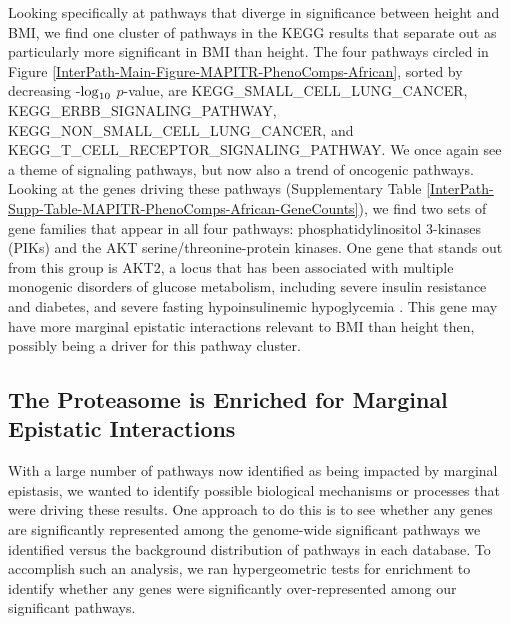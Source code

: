 \documentclass[12pt,a4paper]{article}
\def\log{{\rm log}}
\begin{document}
Looking specifically at pathways that diverge in significance between height and BMI, we find one cluster of pathways in the KEGG results that separate out as particularly more significant in BMI than height. The four pathways circled in Figure \ref{InterPath-Main-Figure-MAPITR-PhenoComps-African}, sorted by decreasing -$\log_{10}$ $p$-value, are KEGG\_SMALL\_CELL\_LUNG\_CANCER, KEGG\_ERBB\_SIGNALING\_PATHWAY, KEGG\_NON\_SMALL\_CELL\_LUNG\_CANCER, and KEGG\_T\_CELL\_RECEPTOR\_SIGNALING\_PATHWAY. We once again see a theme of signaling pathways, but now also a trend of oncogenic pathways. Looking at the genes driving these pathways (Supplementary Table \ref{InterPath-Supp-Table-MAPITR-PhenoComps-African-GeneCounts}), we find two sets of gene families that appear in all four pathways: phosphatidylinositol 3-kinases (PIKs) and the AKT serine/threonine-protein kinases. One gene that stands out from this group is AKT2, a locus that has been associated with multiple monogenic disorders of glucose metabolism, including severe insulin resistance and diabetes, and severe fasting hypoinsulinemic hypoglycemia \citep{George2004,Manning2017,Latva-Rasku2018}. This gene may have more marginal epistatic interactions relevant to BMI than height then, possibly being a driver for this pathway cluster.

\subsection{The Proteasome is Enriched for Marginal Epistatic Interactions}

With a large number of pathways now identified as being impacted by marginal epistasis, we wanted to identify possible biological mechanisms or processes that were driving these results. One approach to do this is to see whether any genes are significantly represented among the genome-wide significant pathways we identified versus the background distribution of pathways in each database. To accomplish such an analysis, we ran hypergeometric tests for enrichment to identify whether any genes were significantly over-represented among our significant pathways. 
\end{document}
